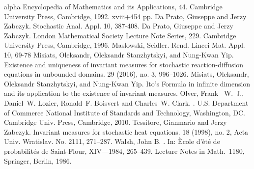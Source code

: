 \documentclass[a4paper,11pt]{article}%
\numberwithin{equation}{section}
\theoremstyle{plain}
\theoremstyle{definition}
\begin{document}
\begin{small}
\begin{thebibliography}{alpha}
		Encyclopedia of Mathematics and its Applications, 44. Cambridge University Press, Cambridge, 1992. xviii+454 pp.
		Da Prato, Giuseppe and Jerzy Zabczyk.
		Stochastic Anal. Appl. 10, 387-408.
		Da Prato, Giuseppe and Jerzy Zabczyk.
		\newblock London Mathematical Society Lecture Note Series, 229. Cambridge University Press, Cambridge, 1996.
		Maslowski, Seidler.
		\newblock Rend. Lincei Mat. Appl. 10, 69-78
		Misiats, Oleksandr, Oleksandr Stanzhytskyi, and Nung-Kwan Yip.
		\newblock Existence and uniqueness of invariant measures for stochastic reaction-diffusion equations in unbounded domains.
		 29 (2016), no. 3, 996--1026.
		Misiats, Oleksandr, Oleksandr Stanzhytskyi, and Nung-Kwan Yip.
		\newblock Ito's Formula in infinite dimension and its application to the existence of invariant measures.
		Olver, Frank ~W.~J., Daniel~W. Lozier, Ronald~F. Boisvert and Charles~W. Clark.
		.
		\newblock U.S. Department of Commerce National Institute of Standards  and Technology, Washington, DC. Cambridge Univ. Press, Cambridge, 2010.
		Tessitore, Gianmario and Jerzy Zabczyk.
		\newblock Invariant measures for stochastic heat equations.
		 18 (1998), no. 2, Acta Univ. Wratislav. No. 2111, 271--287.
		Walsh, John B.
		.
		\newblock In: \`Ecole d'\`et\'e de probabilit\'es de
		Saint-Flour, XIV---1984, 265--439.
		Lecture Notes in Math.\ 1180, Springer, Berlin, 1986.
	\end{thebibliography}
\end{small}
\end{document}
